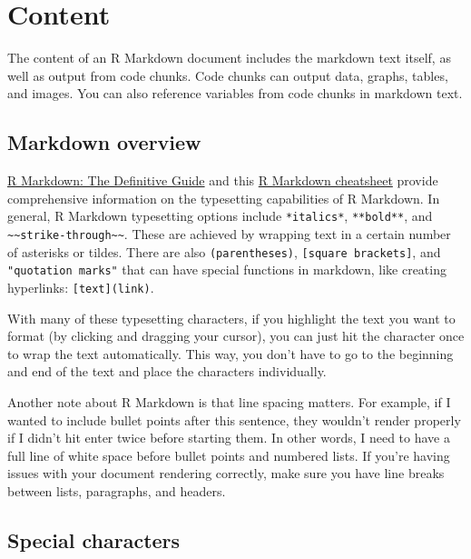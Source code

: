 \documentclass[
]{book}
\begin{document}
\hypertarget{content}{%
\chapter{Content}\label{content}}

The content of an R Markdown document includes the markdown text itself, as well as output from code chunks. Code chunks can output data, graphs, tables, and images. You can also reference variables from code chunks in markdown text.

\hypertarget{markdown-overview}{%
\section{Markdown overview}\label{markdown-overview}}

\href{https://bookdown.org/yihui/rmarkdown/markdown-syntax.html}{R Markdown: The Definitive Guide} and this \href{https://rstudio.com/wp-content/uploads/2015/02/rmarkdown-cheatsheet.pdf}{R Markdown cheatsheet} provide comprehensive information on the typesetting capabilities of R Markdown. In general, R Markdown typesetting options include \texttt{*italics*}, \texttt{**bold**}, and \texttt{\textasciitilde{}\textasciitilde{}strike-through\textasciitilde{}\textasciitilde{}}. These are achieved by wrapping text in a certain number of asterisks or tildes. There are also \texttt{(parentheses)}, \texttt{{[}square\ brackets{]}}, and \texttt{"quotation\ marks"} that can have special functions in markdown, like creating hyperlinks: \texttt{{[}text{]}(link)}.

With many of these typesetting characters, if you highlight the text you want to format (by clicking and dragging your cursor), you can just hit the character once to wrap the text automatically. This way, you don't have to go to the beginning and end of the text and place the characters individually.

Another note about R Markdown is that line spacing matters. For example, if I wanted to include bullet points after this sentence, they wouldn't render properly if I didn't hit enter twice before starting them. In other words, I need to have a full line of white space before bullet points and numbered lists. If you're having issues with your document rendering correctly, make sure you have line breaks between lists, paragraphs, and headers.

\hypertarget{special-characters}{%
\section{Special characters}\label{special-characters}}
\end{document}
